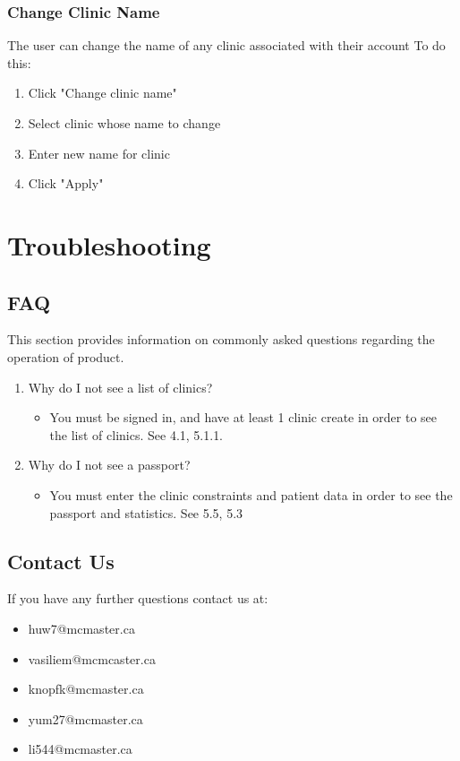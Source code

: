 \documentclass[12pt]{article}
\begin{document}
\subsubsection{Change Clinic Name}
The user can change the name of any clinic associated with their account
To do this: \\
\begin{enumerate}
\item Click "Change clinic name"
\item  Select clinic whose name to change
\item Enter new name for clinic
\item Click "Apply"
\end{enumerate}

\section{Troubleshooting}
\subsection{FAQ}
This section provides information on commonly asked questions regarding the operation of product. \\
\begin{enumerate}
\item  Why do I not see a list of clinics?
\begin{itemize}
\item You must be signed in, and have at least 1 clinic create in order to see the list of clinics. See 4.1, 5.1.1.
\end{itemize}

\item  Why do I not see a passport?
\begin{itemize}
\item You must enter the clinic constraints and patient data in order to see the passport and statistics. See 5.5, 5.3
\end{itemize}
\end{enumerate}
\subsection{Contact Us}
If you have any further questions contact us at:
\begin{itemize}
\item huw7@mcmaster.ca
\item vasiliem@mcmcaster.ca
\item knopfk@mcmaster.ca
\item yum27@mcmaster.ca
\item li544@mcmaster.ca
\end{itemize}
\end{document}
